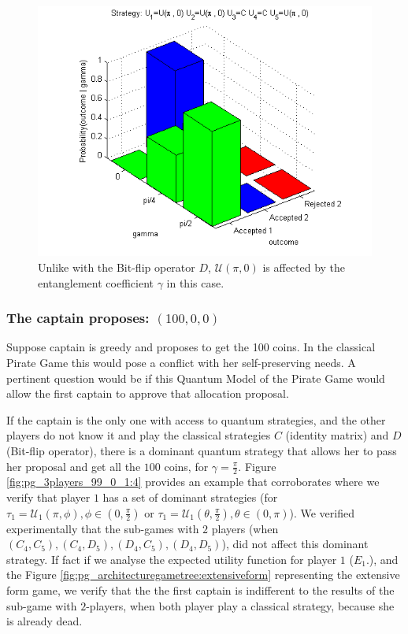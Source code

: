 \documentclass[10pt]{llncs}
\begin{document}
\begin{figure}[h!]
\centering 
\includegraphics[scale=0.50]{Figures/1.5qubit/Upi0Upi0CCUpi0.png}
\caption{Unlike with the Bit-flip operator $D$, $\mathcal{U} (\pi, 0)$ is affected by the entanglement coefficient $\gamma$ in this case. }
\label{fig:pg_3players_99_0_1:3}
\end{figure}




\subsubsection{The captain proposes: $(100, 0, 0)$}
\label{subsubsec:3playergame100}

Suppose captain is greedy and proposes to get the 100 coins. In the classical Pirate Game this would pose a conflict with her self-preserving needs. 
A pertinent question would be if this Quantum Model of the Pirate Game would allow the first captain to approve that allocation proposal. 

If the captain is the only one with access to quantum strategies, and the other players do not know it and play the classical strategies $C$ (identity matrix) and $D$ (Bit-flip operator), there is a dominant quantum strategy that allows her to pass her proposal and get all the $100$ coins, for $\gamma = \frac{\pi}{2}$. Figure \ref{fig:pg_3players_99_0_1:4} provides an example that corroborates where we verify that player $1$ has a set of dominant strategies (for $\tau_{1} = \mathcal{U}_{1}(\pi,\phi), \phi \in (0, \frac{\pi}{2})$ or $\tau_{1} = \mathcal{U}_{1}(\theta,\frac{\pi}{2}), \theta \in (0, \pi)$). We verified experimentally that the sub-games with $2$ players (when $(C_{4},C_{5}), (C_{4},D_{5}), (D_{4},C_{5}), (D_{4},D_{5})$), did not affect this dominant strategy. If fact if we analyse the expected utility function for player $1$ ($E_{1}.$), and the Figure \ref{fig:pg_architecturegametree:extensiveform} representing the extensive form game, we verify that the the first captain is indifferent to the results of the sub-game with $2$-players, when both player play a classical strategy, because she is already dead. 
\end{document}
